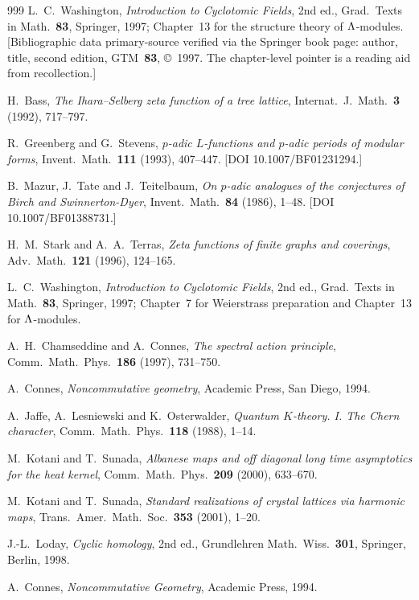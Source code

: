\begin{thebibliography}{999}
 L.~C.~Washington, \emph{Introduction to Cyclotomic Fields}, 2nd ed., Grad.\ Texts in Math.\ \textbf{83}, Springer, 1997; Chapter~13 for the structure theory of $\Lambda$-modules. [Bibliographic data primary-source verified via the Springer book page: author, title, second edition, GTM~\textbf{83}, \copyright~1997. The chapter-level pointer is a reading aid from recollection.]

 H.~Bass, \emph{The Ihara--Selberg zeta function of a tree lattice}, Internat.\ J.\ Math.\ \textbf{3} (1992), 717--797.

 R.~Greenberg and G.~Stevens, \emph{$p$-adic $L$-functions and $p$-adic periods of modular forms}, Invent.\ Math.\ \textbf{111} (1993), 407--447. [DOI 10.1007/BF01231294.]

 B.~Mazur, J.~Tate and J.~Teitelbaum, \emph{On $p$-adic analogues of the conjectures of Birch and Swinnerton-Dyer}, Invent.\ Math.\ \textbf{84} (1986), 1--48. [DOI 10.1007/BF01388731.]

 H.~M.~Stark and A.~A.~Terras, \emph{Zeta functions of finite graphs and coverings}, Adv.\ Math.\ \textbf{121} (1996), 124--165.

 L.~C.~Washington, \emph{Introduction to Cyclotomic Fields}, 2nd ed., Grad.\ Texts in Math.\ \textbf{83}, Springer, 1997; Chapter~7 for Weierstrass preparation and Chapter~13 for $\Lambda$-modules.

 A.~H.~Chamseddine and A.~Connes, \emph{The spectral action principle}, Comm.\ Math.\ Phys.\ \textbf{186} (1997), 731--750.

 A.~Connes, \emph{Noncommutative geometry}, Academic Press, San Diego, 1994.

 A.~Jaffe, A.~Lesniewski and K.~Osterwalder, \emph{Quantum $K$-theory. I. The Chern character}, Comm.\ Math.\ Phys.\ \textbf{118} (1988), 1--14.

 M.~Kotani and T.~Sunada, \emph{Albanese maps and off diagonal long time asymptotics for the heat kernel}, Comm.\ Math.\ Phys.\ \textbf{209} (2000), 633--670.

 M.~Kotani and T.~Sunada, \emph{Standard realizations of crystal lattices via harmonic maps}, Trans.\ Amer.\ Math.\ Soc.\ \textbf{353} (2001), 1--20.

 J.-L.~Loday, \emph{Cyclic homology}, 2nd ed., Grundlehren Math.\ Wiss.\ \textbf{301}, Springer, Berlin, 1998.

 A.~Connes, \emph{Noncommutative Geometry}, Academic Press, 1994.


\end{thebibliography}

